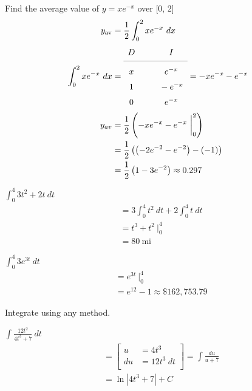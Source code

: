 \documentclass[12pt]{article}
\newenvironment{problem}[2][]{
    \begin{trivlist}
        \item[
            {\bfseries #1}
            {\bfseries #2.}
        ]
}{\end{trivlist}}
\newcommand{\descprob}[1]{\hfill\break #1}
\newcommand{\plugin}[2]{\left(\left({#1}\right) - \left({#2}\right)\right)}
\newcommand{\subu}[2]{
\left[
\begin{alignedat}{1}
u &= #1 \\
du &= #2 \\
\end{alignedat}
\right] 
}
\newcommand{\tikzmark}[1]{%
    \tikz[overlay, remember picture, baseline] \node (#1) {};%
}
\begin{document}
\begin{problem}{41}
Find the average value of $y = xe^{-x}$ over [0, 2]
\begin{align}
y_{\text{av}} &= \frac{1}{2} \int_0^2 xe^{-x} ~ dx \\
\int_0^2 xe^{-x} ~ dx &= 
\renewcommand{\arraystretch}{1.5}
\begin{array}{c @{\hspace*{1.0cm}} c}
D & I \\
\cmidrule{1-2}
x \tikzmark{D1} & \tikzmark{I1}e^{-x} \\
1 \tikzmark{D2} & \tikzmark{I2}-e^{-x} \\
0 \tikzmark{D3} & \tikzmark{I3}e^{-x}
\end{array} = - x e^{-x} - e^{-x} \\
y_{av} &= \frac{1}{2} \left(- x e^{-x} - e^{-x} ~ \bigg|_0^2\right) \\
&= \frac{1}{2} \plugin{-2e^{-2} - e^{-2}}{-1} \\
&= \frac{1}{2} \left(1 - 3e^{-2}\right) \approx 0.297
\end{align}
\end{problem}

\begin{problem}{42}
$\displaystyle\int_0^4 3t^2 + 2t ~ dt$
\begin{align}
&= 3 \int_0^4 t^2 ~ dt + 2 \int_0^4 t ~ dt \\
&= t^3 + t^2 ~ \bigg|_0^4 \\
&= 80 ~ \text{mi}
\end{align}
\end{problem}

\begin{problem}{43}
$\displaystyle\int_0^4 3e^{3t} ~ dt$
\begin{align}
&= e^{3t} ~ \bigg|_0^4 \\
&= e^{12} - 1 \approx \$162,753.79
\end{align}
\end{problem}

\descprob{Integrate using any method.}

\begin{problem}{45}
$\displaystyle\int \frac{12t^2}{4t^3 + 7} ~ dt$
\begin{align}
&= \subu{4t^3}{12t^3 ~ dt} = \int \frac{du}{u + 7} \\
&= \ln \left|4t^3 + 7\right| + C \\
\end{align}
\end{problem}
\end{document}
